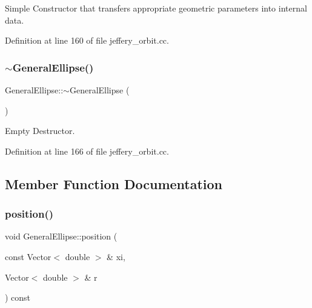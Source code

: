 Simple Constructor that transfers appropriate geometric parameters into internal data. 



Definition at line 160 of file jeffery\+\_\+orbit.\+cc.

\mbox{\label{classGeneralEllipse_a3ac5c17cf8c4998f1b74913860cb3bb9}} 
\subsubsection{\texorpdfstring{$\sim$\+General\+Ellipse()}{~GeneralEllipse()}}
{\footnotesize\ttfamily General\+Ellipse\+::$\sim$\+General\+Ellipse (\begin{DoxyParamCaption}{ }\end{DoxyParamCaption})\hspace{0.3cm}{\ttfamily [inline]}}



Empty Destructor. 



Definition at line 166 of file jeffery\+\_\+orbit.\+cc.



\subsection{Member Function Documentation}
\mbox{\label{classGeneralEllipse_a85e975c70441a9c9c711b5e27d124bff}} 
\subsubsection{\texorpdfstring{position()}{position()}\hspace{0.1cm}{\footnotesize\ttfamily [1/2]}}
{\footnotesize\ttfamily void General\+Ellipse\+::position (\begin{DoxyParamCaption}\item[{const Vector$<$ double $>$ \&}]{xi,  }\item[{Vector$<$ double $>$ \&}]{r }\end{DoxyParamCaption}) const\hspace{0.3cm}{\ttfamily [inline]}}

